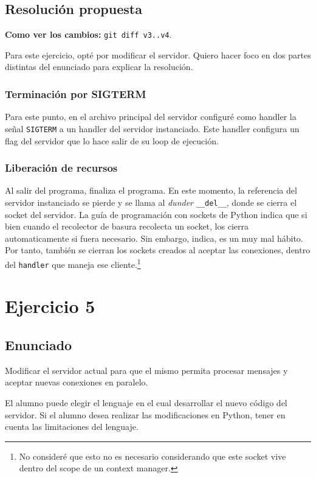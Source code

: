 \documentclass{article}
\begin{document}
\subsection{Resolución propuesta}

\textbf{Como ver los cambios: }\texttt{git diff v3..v4}.

Para este ejercicio, opté por modificar el servidor. Quiero hacer foco en dos partes distintas del enunciado para explicar la resolución.

\subsubsection{Terminación por SIGTERM}
Para este punto, en el archivo principal del servidor configuré como handler la señal \texttt{SIGTERM} a un handler del servidor instanciado\cite{signal}. Este handler configura un flag del servidor que lo hace salir de su loop de ejecución.

\subsubsection{Liberación de recursos}
Al salir del programa, finaliza el programa. En este momento, la referencia del servidor instanciado se pierde y se llama al \textit{dunder} \texttt{\_\_del\_\_}\cite{DelDunder}, donde se cierra el socket del servidor. La guía de programación con sockets de Python\cite{SocketHOWTO} indica que si bien cuando el recolector de basura recolecta un socket, los cierra automaticamente si fuera necesario. Sin embargo, indica, es un muy mal hábito. Por tanto, también se cierran los sockets creados al aceptar las conexiones, dentro del \texttt{handler} que maneja ese cliente.\footnote{No consideré que esto no es necesario considerando que este socket vive dentro del scope de un context manager.}

\section{Ejercicio 5}

\subsection{Enunciado}
Modificar el servidor actual para que el mismo permita procesar mensajes y aceptar nuevas conexiones en paralelo.

El alumno puede elegir el lenguaje en el cual desarrollar el nuevo código del servidor. Si el alumno desea realizar las modificaciones en Python, tener en cuenta las limitaciones del lenguaje.
\end{document}
